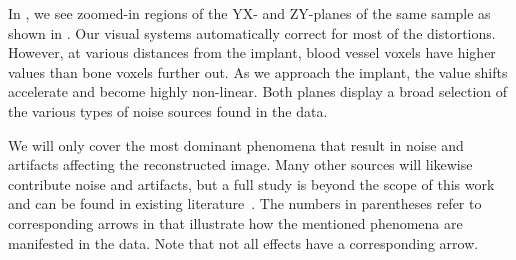 In , we see zoomed-in regions of the YX- and ZY-planes of the
same sample as shown in .  Our visual systems
automatically correct for most of the distortions. However, at various
distances from the implant, blood vessel voxels have higher values than bone
voxels further out. As we approach the implant, the value shifts accelerate and
become highly non-linear.  Both planes display a broad selection of the various
types of noise sources found in the data.

We will only cover the most dominant phenomena that result in noise and
artifacts affecting the reconstructed image. Many other sources will likewise
contribute noise and artifacts, but a full study is beyond the scope of this
work and can be found in existing
literature~\cite{noise_and_artifacts_1,noise_and_artifacts_2}. The numbers in
parentheses refer to corresponding arrows in  that illustrate
how the mentioned phenomena are manifested in the data. Note that not all
effects have a corresponding arrow.

